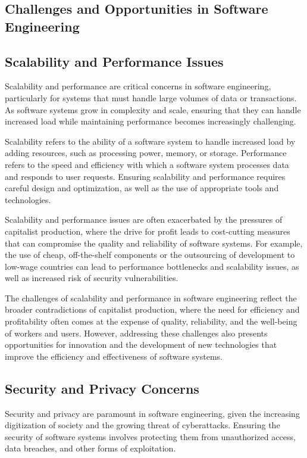 \begin{refsection}
\section{Challenges and Opportunities in Software Engineering}
\begin{multicols}{2}
{\small
\subsection{Scalability and Performance Issues}

Scalability and performance are critical concerns in software engineering, particularly for systems that must handle large volumes of data or transactions. As software systems grow in complexity and scale, ensuring that they can handle increased load while maintaining performance becomes increasingly challenging.

Scalability refers to the ability of a software system to handle increased load by adding resources, such as processing power, memory, or storage. Performance refers to the speed and efficiency with which a software system processes data and responds to user requests. Ensuring scalability and performance requires careful design and optimization, as well as the use of appropriate tools and technologies.

Scalability and performance issues are often exacerbated by the pressures of capitalist production, where the drive for profit leads to cost-cutting measures that can compromise the quality and reliability of software systems. For example, the use of cheap, off-the-shelf components or the outsourcing of development to low-wage countries can lead to performance bottlenecks and scalability issues, as well as increased risk of security vulnerabilities.

The challenges of scalability and performance in software engineering reflect the broader contradictions of capitalist production, where the need for efficiency and profitability often comes at the expense of quality, reliability, and the well-being of workers and users. However, addressing these challenges also presents opportunities for innovation and the development of new technologies that improve the efficiency and effectiveness of software systems.

\subsection{Security and Privacy Concerns}

Security and privacy are paramount in software engineering, given the increasing digitization of society and the growing threat of cyberattacks. Ensuring the security of software systems involves protecting them from unauthorized access, data breaches, and other forms of exploitation.

}
\end{multicols}
\end{refsection}
